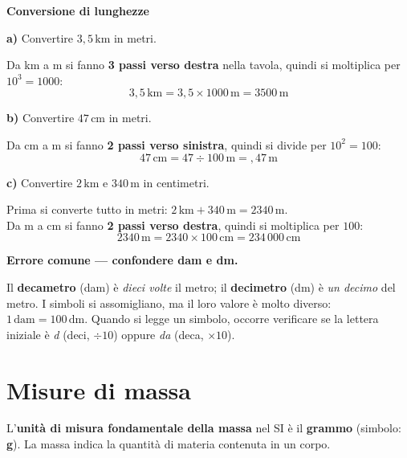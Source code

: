 \begin{esempio}
    \textbf{Conversione di lunghezze}

    \medskip
    \textbf{a)} Convertire $3{,}5\,\text{km}$ in metri.

    Da km a m si fanno \textbf{3 passi verso destra} nella tavola, quindi si moltiplica per $10^3 = 1000$:
    \[
        3{,}5\,\text{km} = 3{,}5 \times 1000\,\text{m} = 3500\,\text{m}
    \]

    \medskip
    \textbf{b)} Convertire $47\,\text{cm}$ in metri.

    Da cm a m si fanno \textbf{2 passi verso sinistra}, quindi si divide per $10^2 = 100$:
    \[
        47\,\text{cm} = 47 \div 100\,\text{m} = {,}47\,\text{m}
    \]

    \medskip
    \textbf{c)} Convertire $2\,\text{km}$ e $340\,\text{m}$ in centimetri.

    Prima si converte tutto in metri: $2\,\text{km} + 340\,\text{m} = 2340\,\text{m}$.\\
    Da m a cm si fanno \textbf{2 passi verso destra}, quindi si moltiplica per $100$:
    \[
        2340\,\text{m} = 2340 \times 100\,\text{cm} = 234\,000\,\text{cm}
    \]
\end{esempio}

\begin{attenzione}
    \textbf{Errore comune — confondere dam e dm.}

    Il \textbf{decametro} (dam) è \emph{dieci volte} il metro; il \textbf{decimetro} (dm) è \emph{un decimo} del metro. I simboli si assomigliano, ma il loro valore è molto diverso: $1\,\text{dam} = 100\,\text{dm}$. Quando si legge un simbolo, occorre verificare se la lettera iniziale è \emph{d} (deci, $\div 10$) oppure \emph{da} (deca, $\times 10$).
\end{attenzione}

\section{Misure di massa}

\begin{definizione}
    L'\textbf{unità di misura fondamentale della massa} nel SI è il \textbf{grammo} (simbolo: \textbf{g}). La massa indica la quantità di materia contenuta in un corpo.
\end{definizione}

